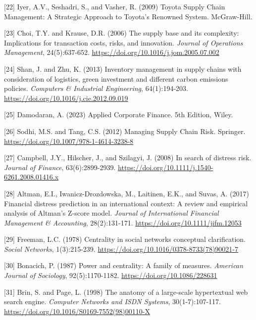 \documentclass[a4 paper, 11pt,twoside]{article}
\newcommand{\0}{\Bf{0}}
\theoremstyle{definition}
\begin{document}
\label{ref22}[22] Iyer, A.V., Seshadri, S., and Vasher, R. (2009) Toyota Supply Chain Management: A Strategic Approach to Toyota's Renowned System. McGraw-Hill.

\label{ref23}[23] Choi, T.Y. and Krause, D.R. (2006) The supply base and its complexity: Implications for transaction costs, risks, and innovation. \emph{Journal of Operations Management}, 24(5):637-652. \href{https://doi.org/10.1016/j.jom.2005.07.002}{https://doi.org/10.1016/j.jom.2005.07.002}

\label{ref24}[24] Shan, J. and Zhu, K. (2013) Inventory management in supply chains with consideration of logistics, green investment and different carbon emissions policies. \emph{Computers \& Industrial Engineering}, 64(1):194-203. \href{https://doi.org/10.1016/j.cie.2012.09.019}{https://doi.org/10.1016/j.cie.2012.09.019}

\label{ref25}[25] Damodaran, A. (2023) Applied Corporate Finance. 5th Edition, Wiley.

\label{ref26}[26] Sodhi, M.S. and Tang, C.S. (2012) Managing Supply Chain Risk. Springer. \href{https://doi.org/10.1007/978-1-4614-3238-8}{https://doi.org/10.1007/978-1-4614-3238-8}

\label{ref27}[27] Campbell, J.Y., Hilscher, J., and Szilagyi, J. (2008) In search of distress risk. \emph{Journal of Finance}, 63(6):2899-2939. \href{https://doi.org/10.1111/j.1540-6261.2008.01416.x}{https://doi.org/10.1111/j.1540-6261.2008.01416.x}

\label{ref28}[28] Altman, E.I., Iwanicz-Drozdowska, M., Laitinen, E.K., and Suvas, A. (2017) Financial distress prediction in an international context: A review and empirical analysis of Altman's Z-score model. \emph{Journal of International Financial Management \& Accounting}, 28(2):131-171. \href{https://doi.org/10.1111/jifm.12053}{https://doi.org/10.1111/jifm.12053}

\label{ref29}[29] Freeman, L.C. (1978) Centrality in social networks conceptual clarification. \emph{Social Networks}, 1(3):215-239. \href{https://doi.org/10.1016/0378-8733(78)90021-7}{https://doi.org/10.1016/0378-8733(78)90021-7}

\label{ref30}[30] Bonacich, P. (1987) Power and centrality: A family of measures. \emph{American Journal of Sociology}, 92(5):1170-1182. \href{https://doi.org/10.1086/228631}{https://doi.org/10.1086/228631}

\label{ref31}[31] Brin, S. and Page, L. (1998) The anatomy of a large-scale hypertextual web search engine. \emph{Computer Networks and ISDN Systems}, 30(1-7):107-117. \href{https://doi.org/10.1016/S0169-7552(98)00110-X}{https://doi.org/10.1016/S0169-7552(98)00110-X}
\end{document}
